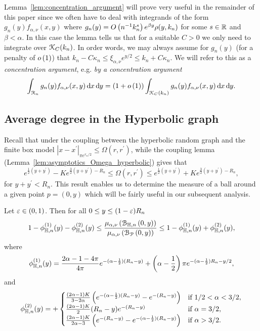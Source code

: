 \begin{remark}\label{rmk:concentration_argument}
Lemma~\ref{lem:concentration_argument} will prove very useful in the remainder of this paper since we often have to deal with integrands of the form $g_n(y) f_{\alpha,\nu}(x,y)$ where $g_n(y) = O\left(n^{-1} k_n^{s}\right)e^{\beta y}\rho(y,k_n)$ for some $s \in {\ensuremath{\mathbb R}}$ and $\beta < \alpha$. In this case the lemma tells us that for a suitable $C > 0$ we only need to integrate over ${\mathcal K}_C(k_n)$. In order words, we may always assume for $g_n(y)$ (for a penalty of $o\left(1\right)$) that $k_n - C \kappa_n \le \xi_{\alpha,\nu} e^{y/2} \le k_n + C \kappa_n$. We will refer to this as a \emph{concentration argument}, e.g. \emph{by a concentration argument}
\[
	\int_{{\mathcal R}_n} g_n(y) f_{\alpha, \nu}(x,y) \operatorname{\mathrm{d}\hspace{-2pt}} x \operatorname{\mathrm{d}\hspace{-2pt}} y 
	= (1+o\left(1\right)) \int_{{\mathcal K}_C(k_n)} g_n(y) f_{\alpha, \nu}(x,y) \operatorname{\mathrm{d}\hspace{-2pt}} x \operatorname{\mathrm{d}\hspace{-2pt}} y.
\]
\end{remark}

\subsection{Average degree in the Hyperbolic graph}\label{ssec:average_degree_HP_n}

Recall that under the coupling between the hyperbolic random graph and the finite box model $|x-x^\prime|_{\pi e^{r_n/2}} \le \Omega(r,r^\prime)$, while the coupling lemma (Lemma~\ref{lem:asymptotics_Omega_hyperbolic}) gives that  
\[
	e^{\frac{1}{2}(y+y^\prime)} - K e^{\frac{3}{2}(y+y^\prime) - R_n} \leq \Omega(r, r^\prime) 
		\leq  e^{\frac{1}{2}(y+y^\prime)} + K e^{\frac{3}{2}(y+y^\prime) - R_n},
\]
for $y + y^\prime < R_n$. This result enables us to determine the measure of a ball around a given point $p=(0,y)$ which will be fairly useful in our subsequent analysis. 

\begin{lemma}\label{lem:average_degree_hyperbolic}
Let $\varepsilon \in (0, 1)$. Then for all $0 \le y \le (1 - \varepsilon)R_n$
\[
	 1 - \phi_{\mathbb{H},n}^{(1)}(y) - \phi_{\mathbb{H},n}^{(2)}(y) \le \frac{\mu_{\alpha,\nu}\left({\mathcal B}_{\mathbb{H},n}\left(0,y\right)\right)}{\mu_{\alpha,\nu}\left({\mathcal B}_{{\mathcal P}}\left(0,y\right)\right)} 
	 \le 1 - \phi_{\mathbb{H},n}^{(1)}(y) + \phi_{\mathbb{H},n}^{(2)}(y),
\]
where
\[
	\phi_{\mathbb{H},n}^{(1)}(y) = \frac{2\alpha - 1 - 4\pi}{4\pi} e^{-(\alpha - \frac{1}{2})(R_n - y)} 
		+ \left(\alpha - \frac{1}{2}\right)\pi e^{-(\alpha - \frac{1}{2})R_n - y/2},
\]
and
\[
	\phi_{\mathbb{H},n}^{(2)}(y) = 
	+ \begin{cases}
			\frac{(2\alpha - 1)K}{3 - 2\alpha}\left(e^{-(\alpha - \frac{1}{2})(R_n - y)} - e^{-(R_n - y)}\right)
			&\mbox{if } 1/2 < \alpha < 3/2,\\
			\frac{(2\alpha -1)K}{2} (R_n - y)e^{-(R_n - y)} &\mbox{if } \alpha = 3/2,\\
			\frac{(2\alpha - 1)K}{2\alpha - 3} \left(e^{-(R_n - y)} - e^{-(\alpha - \frac{1}{2})(R_n - y)}\right)
			&\mbox{if } \alpha > 3/2.
		\end{cases}
\]
\end{lemma}

